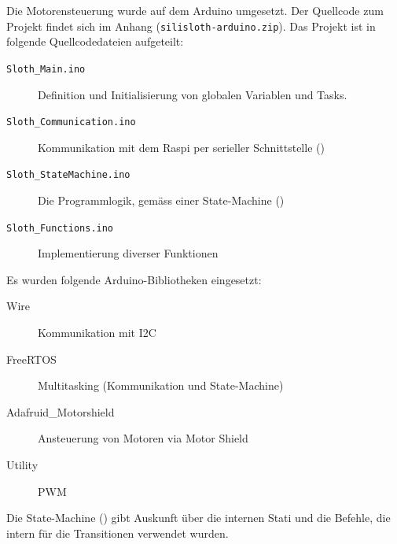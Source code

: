\label{sec:arduino}

Die Motorensteuerung wurde auf dem Arduino umgesetzt. Der Quellcode zum Projekt findet sich im Anhang (\texttt{silisloth-arduino.zip}). Das Projekt ist in folgende Quellcodedateien aufgeteilt:

\begin{description}
    \item[\texttt{Sloth\_Main.ino}] Definition und Initialisierung von globalen Variablen und Tasks.
    \item[\texttt{Sloth\_Communication.ino}] Kommunikation mit dem Raspi per serieller Schnittstelle ()
    \item[\texttt{Sloth\_StateMachine.ino}] Die Programmlogik, gemäss einer State-Machine ()
    \item[\texttt{Sloth\_Functions.ino}] Implementierung diverser Funktionen
\end{description}

Es wurden folgende Arduino-Bibliotheken eingesetzt:

\begin{description}
    \item[Wire] Kommunikation mit I2C
    \item[FreeRTOS] Multitasking (Kommunikation und State-Machine)
    \item[Adafruid\_Motorshield] Ansteuerung von Motoren via Motor Shield
    \item[Utility] PWM

\end{description}

Die State-Machine () gibt Auskunft über die internen Stati und die Befehle, die intern für die Transitionen verwendet wurden.

